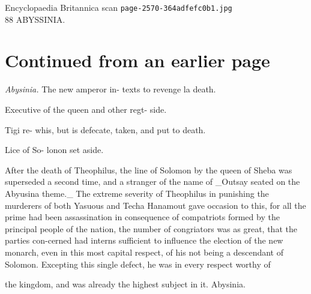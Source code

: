 \documentclass{article}
\begin{document}
\begin{center}
{\Large Encyclopaedia Britannica scan \texttt{page-2570-364adfefc0b1.jpg}}\\[0.5em]
88 ABYSSINIA.
\end{center}
\section*{Continued from an earlier page}
\textit{Abysinia.}
The new amperor in- texts to revenge la death.

Executive of the queen and other regt- side.

Tigi re- whis, but is defecate, taken, and put to death.

Lice of So- lonon set aside.

After the death of Theophilus, the line of Solomon by the queen of Sheba was superseded a second time, and a stranger of the name of \_Outsay seated on the Abyusina theme.\_ The extreme severity of Theophilus in punishing the murderers of both Yasuous and Techa Hanamout gave occasion to this, for all the prime had been assassination in consequence of compatriots formed by the principal people of the nation, the number of congriators was as great, that the parties con-cerned had interns sufficient to influence the election of the new monarch, even in this most capital respect, of his not being a descendant of Solomon. Excepting this single defect, he was in every respect worthy of

the kingdom, and was already the highest subject in it. Abysinia.
\end{document}

